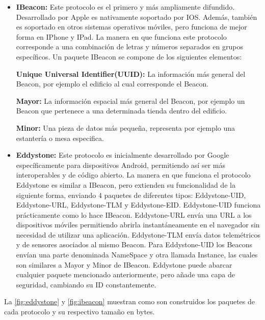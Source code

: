 \begin{itemize}
\item \textbf{IBeacon: } Este protocolo es el primero y más ampliamente difundido. Desarrollado por Apple es nativamente soportado por IOS. Además, también es soportado en otros sistemas operativos móviles, pero funciona de mejor forma en IPhone y IPad. La manera en que funciona este protocolo corresponde a una combinación de letras y números separados en grupos específicos. Un paquete IBeacon se compone de los siguientes elementos:

\textbf{Unique Universal Identifier(UUID): } La información más general del Beacon, por ejemplo el edificio al cual corresponde el Beacon.

\textbf{Mayor: } La información espacial más general del Beacon, por ejemplo un Beacon que pertenece a una determinada tienda dentro del edificio.

\textbf{Minor: } Una pieza de datos más pequeña, representa por ejemplo una estantería o mesa especifica.

\item \textbf{Eddystone: } Este protocolo es inicialmente desarrollado por Google específicamente para dispositivos Android, permitiendo así ser más interoperables y de código abierto. La manera en que funciona el protocolo Eddystone es similar a IBeacon, pero extienden su funcionalidad de la siguiente forma, enviando 4 paquetes de diferentes tipos: Eddystone-UID, Eddystone-URL, Eddystone-TLM y Eddystone-EID. Eddystone-UID funciona prácticamente como lo hace IBeacon. Eddystone-URL envía una URL a los dispositivos móviles permitiendo abrirla instantáneamente en el navegador sin necesidad de utilizar una aplicación. Eddystone-TLM envía datos telemétricos y de sensores asociados al mismo Beacon. Para Eddystone-UID los Beacons envían una parte denominada NameSpace y otra llamada Instance, las cuales son similares a Mayor y Minor de IBeacon. Eddystone puede abarcar cualquier paquete mencionado anteriormente, pero añade una capa de seguridad, cambiando su ID constantemente.

\end{itemize}

La \autoref{fig:eddystone} y \ref{fig:ibeacon} muestran como son construidos los paquetes de cada protocolo y su respectivo tamaño en bytes.

